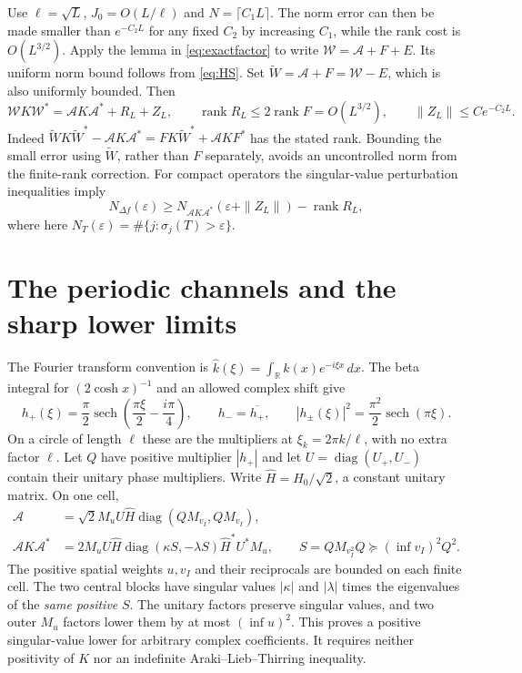 \documentclass[11pt]{article}
\numberwithin{equation}{section}
\newcommand{\rank}{\operatorname{rank}}
\newcommand{\sech}{\operatorname{sech}}
\newcommand{\R}{\mathbb R}
\newcommand{\cW}{\mathcal W}
\newcommand{\cA}{\mathcal A}
\newcommand{\diag}{\operatorname{diag}}
\begin{document}
Use $\ell=\sqrt L$, $J_0=O(L/\ell)$ and $N=\lceil C_1L\rceil$.
The norm error can then be made smaller than $e^{-C_2L}$ for any
fixed $C_2$ by increasing $C_1$, while the rank cost is $O(L^{3/2})$.
Apply the lemma in \eqref{eq:exactfactor} to write
$\cW=\cA+F+E$. Its uniform norm bound follows from \eqref{eq:HS}.
Set $\widetilde W=\cA+F=\cW-E$, which is also uniformly bounded.
Then
\begin{equation}\label{eq:producterror}
 \cW K\cW^*=\cA K\cA^*+R_L+Z_L,\qquad
 \rank R_L\le2\rank F=O(L^{3/2}),\qquad
 \|Z_L\|\le C e^{-C_2L}.
\end{equation}
Indeed
$\widetilde W K\widetilde W^*-\cA K\cA^*
 =FK\widetilde W^*+\cA KF^*$ has the stated rank. Bounding the
small error using $\widetilde W$, rather than $F$ separately, avoids
an uncontrolled norm from the finite-rank correction. For compact
operators the singular-value perturbation inequalities imply
\begin{equation}\label{eq:rankperturb}
 N_{\Delta f}(\varepsilon)\ge
 N_{\cA K\cA^*}(\varepsilon+\|Z_L\|)-\rank R_L,
\end{equation}
where here $N_T(\varepsilon)=\#\{j:\sigma_j(T)>\varepsilon\}$.

\section{The periodic channels and the sharp lower limits}

The Fourier transform convention is
$\widehat k(\xi)=\int_\R k(x)e^{-i\xi x}\,dx$.
The beta integral for $(2\cosh x)^{-1}$ and an allowed complex shift
give
\begin{equation}\label{eq:fourier}
 h_+(\xi)=\frac\pi2\sech\left(\frac{\pi\xi}2-\frac{i\pi}4\right),
 \qquad h_- =\overline{h_+},\qquad
 |h_\pm(\xi)|^2=\frac{\pi^2}{2}\sech(\pi\xi).
\end{equation}
On a circle of length $\ell$ these are the multipliers at
$\xi_k=2\pi k/\ell$, with no extra factor $\ell$.
Let $Q$ have positive multiplier $|h_+|$ and let
$U=\diag(U_+,U_-)$ contain their unitary phase multipliers.
Write $\widehat H=H_0/\sqrt2$, a constant unitary matrix. On one cell,
\begin{align}
 \cA&=\sqrt2 M_u U\widehat H\diag(QM_{v_I},QM_{v_I}),\nonumber\\
 \cA K\cA^*
 &=2M_u U\widehat H\diag(\kappa S,-\lambda S)
                 \widehat H^*U^*M_u,
 \qquad S=Q M_{v_I^2}Q\succeq (\inf v_I)^2 Q^2.\label{eq:cell}
\end{align}
The positive spatial weights $u,v_I$ and their reciprocals are bounded
on each finite cell.
The two central blocks have singular values $|\kappa|$ and $|\lambda|$
times the eigenvalues of the \emph{same positive} $S$. The unitary
factors preserve singular values, and two outer $M_u$ factors lower
them by at most $(\inf u)^2$. This proves a positive singular-value
lower for arbitrary complex coefficients. It requires neither
positivity of $K$ nor an indefinite Araki--Lieb--Thirring inequality.
\end{document}
